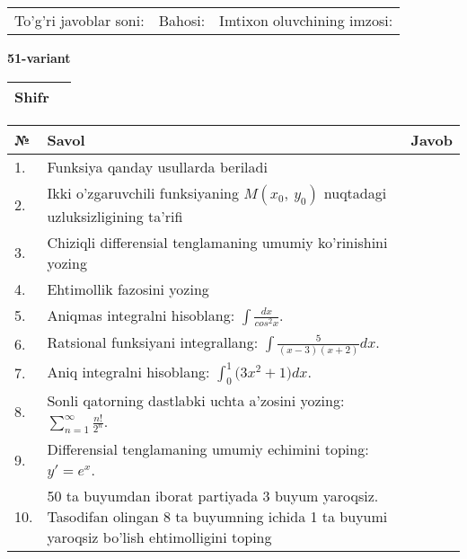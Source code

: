 \documentclass{article}
\begin{document}
  \vspace{1cm}
  
  \begin{tabular}{lll}
  To'g'ri javoblar soni: \underline{\hspace{1.5cm}} & 
  Bahosi: \underline{\hspace{1.5cm}} & 
  Imtixon oluvchining imzosi: \underline{\hspace{2cm}} \\
  \end{tabular}
  
  \egroup
  
  \newpage
  
  
  \textbf{51-variant}\\
  
  \bgroup
  \def\arraystretch{1.6} %
  
  \begin{tabular}{|m{5.7cm}|m{9.5cm}|}
  \hline
  Shifr & \\
  \hline
  \end{tabular}
  
  \vspace{1cm}
  
  \begin{tabular}{|m{0.7cm}|m{10cm}|m{4cm}|}
  \hline
  № & Savol & Javob \\
  \hline
  1. & Funksiya qanday usullarda beriladi &  \\
  \hline
  2. & Ikki o'zgaruvchili funksiyaning \(M(x_{0},\ y_{0})\) nuqtadagi uzluksizligining ta'rifi &  \\
  \hline
  3. & Chiziqli differensial tenglamaning umumiy ko'rinishini yozing &  \\
  \hline
  4. & Ehtimollik fazosini yozing &  \\
  \hline
  5. & Aniqmas integralni hisoblang: \(\int \frac{dx}{cos^{2}x}\). &  \\
  \hline
  6. & Ratsional funksiyani integrallang: \(\int {\frac{5}{(x - 3)(x + 2)}dx}\). &  \\
  \hline
  7. & Aniq integralni hisoblang: \(\int_{0}^{1}{(3x^{2}} + 1)dx\). &  \\
  \hline
  8. & Sonli qatorning dastlabki uchta a'zosini yozing: \(\sum_{n = 1}^{\infty}\frac{n!}{2^{n}}\). &  \\
  \hline
  9. & Differensial tenglamaning umumiy echimini toping: \(y' = e^{x}\). &  \\
  \hline
  10. & 50 ta buyumdan iborat partiyada 3 buyum yaroqsiz. Tasodifan olingan 8 ta buyumning ichida 1 ta buyumi yaroqsiz bo'lish ehtimolligini toping &  \\
  \hline
  \end{tabular}
  
\end{document}
